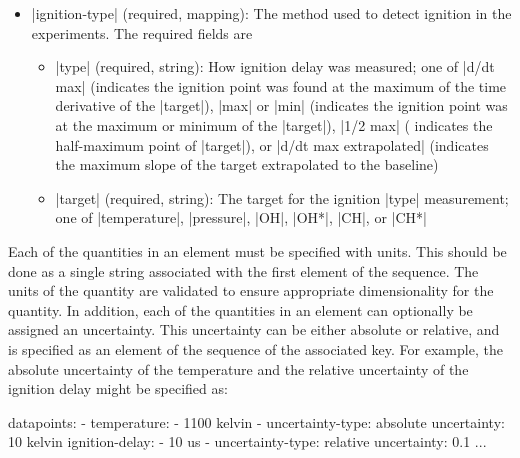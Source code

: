 \documentclass[12pt]{ijck}
\begin{document}
\begin{itemize}
    \item \yabox|ignition-type| (required, mapping): The method used to detect
    ignition in the experiments. The required fields are
    \begin{itemize}
        \item \yabox|type| (required, string): How ignition delay was
        measured; one of \yabox|d/dt max| (indicates the ignition point was
        found at the maximum of the time derivative of the \yabox|target|),
        \yabox|max| or \yabox|min| (indicates the ignition point was at the
        maximum or minimum of the \yabox|target|), \yabox|1/2 max| (
        indicates the half-maximum point of \yabox|target|), or \yabox|d/dt max extrapolated|
        (indicates the maximum slope of the target extrapolated to the baseline)
        \item \yabox|target| (required, string): The target for the ignition
        \yabox|type| measurement; one of \yabox|temperature|, \yabox|pressure|,
        \yabox|OH|, \yabox|OH*|, \yabox|CH|, or \yabox|CH*|
    \end{itemize}
\end{itemize}

Each of the
quantities in an element must be specified with units. This should be done as a
single string associated with the first element of the sequence. The units of
the quantity are validated to ensure appropriate dimensionality
for the quantity. In addition, each of the quantities in an element can
optionally be assigned an uncertainty. This uncertainty can be either absolute
or relative, and is specified as an element of the sequence of the associated key.
For example, the absolute uncertainty of the temperature and the relative
uncertainty of the ignition delay might be specified as:
%
\begin{yamlbox}
datapoints:
  - temperature:
      - 1100 kelvin
      - uncertainty-type: absolute
        uncertainty: 10 kelvin
    ignition-delay:
      - 10 us
      - uncertainty-type: relative
        uncertainty: 0.1
    ...
\end{yamlbox}
\end{document}
